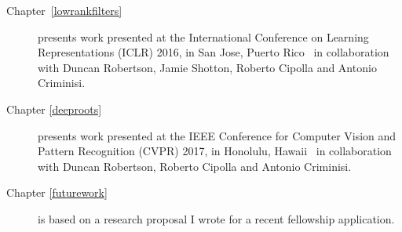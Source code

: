\begin{acknowledgements}
\begin{description}
	\item[Chapter~\ref{lowrankfilters}] presents work presented at the International Conference on Learning Representations (ICLR) 2016, in San Jose, Puerto Rico~\cite{Ioannou2016} in collaboration with Duncan Robertson, Jamie Shotton, Roberto Cipolla and Antonio Criminisi.

	\item[Chapter \ref{deeproots}] presents work presented at the IEEE Conference for Computer Vision and Pattern Recognition (CVPR) 2017, in Honolulu, Hawaii~\cite{ioannou2016e} in collaboration with Duncan Robertson, Roberto Cipolla and Antonio Criminisi.
	
	\item[Chapter \ref{futurework}] is based on a research proposal I wrote for a recent fellowship application.
\end{description}


\end{acknowledgements}
